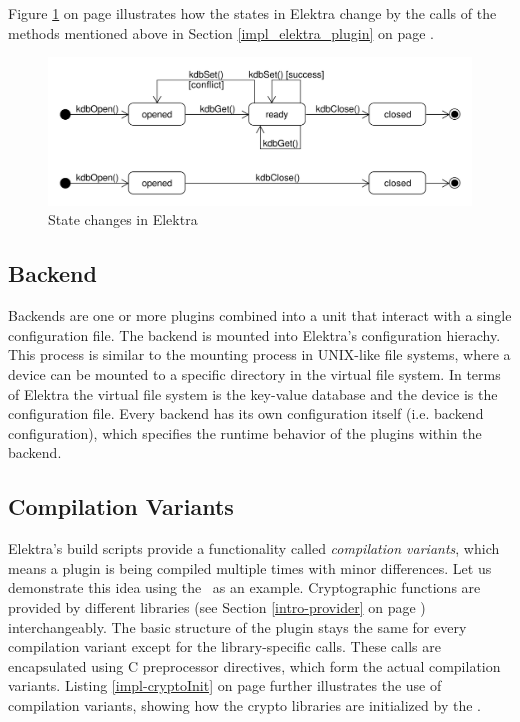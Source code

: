 Figure \ref{impl_elektra_states} on page \pageref{impl_elektra_states} illustrates how the states in Elektra change by the calls of the methods mentioned above in Section \ref{impl_elektra_plugin} on page \pageref{impl_elektra_plugin}.

\begin{figure}[h]
\center
\caption{State changes in Elektra}
\label{impl_elektra_states}
\includegraphics[width=15.0cm]{umlet-figures/impl_elektra_state.pdf}
\end{figure}

\subsection{Backend}

Backends are one or more plugins combined into a unit that interact with a single configuration file.
The backend is mounted into Elektra's configuration hierachy.
This process is similar to the mounting process in UNIX-like file systems, where a device can be mounted to a specific directory in the virtual file system.
In terms of Elektra the virtual file system is the key-value database and the device is the configuration file.
Every backend has its own configuration itself (i.e. backend configuration), which specifies the runtime behavior of the plugins within the backend.

\subsection{Compilation Variants}

Elektra's build scripts provide a functionality called \emph{compilation variants}, which means a plugin is being compiled multiple times with minor differences.
Let us demonstrate this idea using the \crypto ~as an example.
Cryptographic functions are provided by different libraries (see Section \ref{intro-provider} on page \pageref{intro-provider}) interchangeably.
The basic structure of the plugin stays the same for every compilation variant except for the library-specific calls.
These calls are encapsulated using C preprocessor directives, which form the actual compilation variants.
Listing \ref{impl-cryptoInit} on page \pageref{impl-cryptoInit} further illustrates the use of compilation variants, showing how the crypto libraries are initialized by the \crypto.

